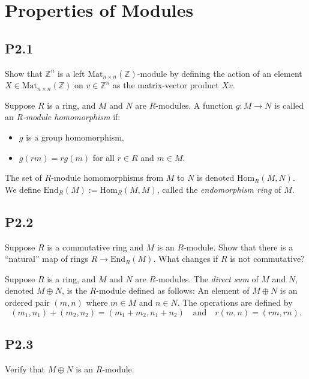 \documentclass[lang=cn,11pt]{template}
\begin{document}
\section{Properties of Modules}

\subsection*{P2.1} Show that \( \mathbb{Z}^n \) is a left \( \text{Mat}_{n \times n}(\mathbb{Z}) \)-module by defining the action of an element \( X \in \text{Mat}_{n \times n}(\mathbb{Z}) \) on \( v \in \mathbb{Z}^n \) as the matrix-vector product \( Xv \).

\begin{definition}
Suppose \( R \) is a ring, and \( M \) and \( N \) are \( R \)-modules. A function \( g : M \to N \) is called an \textit{R-module homomorphism} if:
\begin{itemize}
    \item \( g \) is a group homomorphism,
    \item \( g(rm) = rg(m) \) for all \( r \in R \) and \( m \in M \).
\end{itemize}
The set of \( R \)-module homomorphisms from \( M \) to \( N \) is denoted \( \text{Hom}_R(M, N) \). We define \( \text{End}_R(M) := \text{Hom}_R(M, M) \), called the \textit{endomorphism ring} of \( M \).
\end{definition}

\subsection*{P2.2} Suppose \( R \) is a commutative ring and \( M \) is an \( R \)-module. Show that there is a “natural” map of rings \( R \to \text{End}_R(M) \). What changes if \( R \) is not commutative?

\begin{definition}
Suppose \( R \) is a ring, and \( M \) and \( N \) are \( R \)-modules. The \textit{direct sum} of \( M \) and \( N \), denoted \( M \oplus N \), is the \( R \)-module defined as follows: An element of \( M \oplus N \) is an ordered pair \( (m, n) \) where \( m \in M \) and \( n \in N \). The operations are defined by
\[
(m_1, n_1) + (m_2, n_2) = (m_1 + m_2, n_1 + n_2) \quad \text{and} \quad r(m, n) = (rm, rn).
\]
\end{definition}

\subsection*{P2.3} Verify that \( M \oplus N \) is an \( R \)-module.
\end{document}
